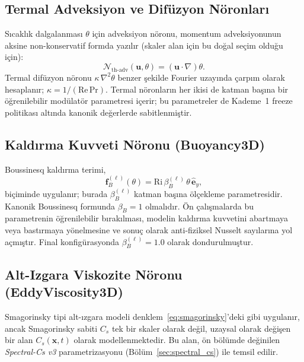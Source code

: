 \subsection{Termal Adveksiyon ve Difüzyon Nöronları}

Sıcaklık dalgalanması $\theta$ için adveksiyon nöronu, momentum adveksiyonunun aksine non-konservatif formda yazılır (skaler alan için bu doğal seçim olduğu için):
\begin{equation}
\mathcal{N}_{\mathrm{th\text{-}adv}}(\mathbf{u},\theta) = (\mathbf{u}\cdot\nabla)\theta.
\label{eq:thermal_advection}
\end{equation}
Termal difüzyon nöronu $\kappa\,\nabla^{2}\theta$ benzer şekilde Fourier uzayında çarpım olarak hesaplanır; $\kappa = 1/(\mathrm{Re}\,\mathrm{Pr})$. Termal nöronların her ikisi de katman başına bir öğrenilebilir modülatör parametresi içerir; bu parametreler de Kademe~1 freeze politikası altında kanonik değerlerde sabitlenmiştir.

\subsection{Kaldırma Kuvveti Nöronu (Buoyancy3D)}

Boussinesq kaldırma terimi,
\begin{equation}
\mathbf{f}_{B}^{(\ell)}(\theta) = \mathrm{Ri}\,\beta_{B}^{(\ell)}\,\theta\,\hat{\mathbf{e}}_{y},
\label{eq:buoyancy_neuron}
\end{equation}
biçiminde uygulanır; burada $\beta_{B}^{(\ell)}$ katman başına ölçekleme parametresidir. Kanonik Boussinesq formunda $\beta_{B}=1$ olmalıdır. Ön çalışmalarda bu parametrenin öğrenilebilir bırakılması, modelin kaldırma kuvvetini abartmaya veya bastırmaya yönelmesine ve sonuç olarak anti-fiziksel Nusselt sayılarına yol açmıştır. Final konfigürasyonda $\beta_{B}^{(\ell)}=1.0$ olarak dondurulmuştur.

\subsection{Alt-Izgara Viskozite Nöronu (EddyViscosity3D)}
\label{subsec:eddy_viscosity}

Smagorinsky tipi alt-ızgara modeli denklem~\eqref{eq:smagorinsky}'deki gibi uygulanır, ancak Smagorinsky sabiti $C_{s}$ tek bir skaler olarak değil, uzaysal olarak değişen bir alan $C_{s}(\mathbf{x},t)$ olarak modellenmektedir. Bu alan, ön bölümde değinilen \emph{Spectral-Cs v3} parametrizasyonu (Bölüm~\ref{sec:spectral_cs}) ile temsil edilir.

